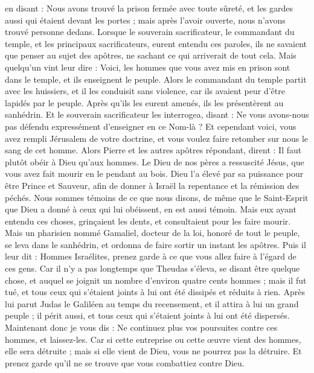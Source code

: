 \begin{multicols}{2}
{en disant : Nous avons trouvé la prison fermée avec toute sûreté, et les gardes aussi qui étaient devant les portes ; mais après l'avoir ouverte, nous n'avons trouvé personne dedans.
Lorsque le souverain sacrificateur, le commandant du temple, et les principaux sacrificateurs, eurent entendu ces paroles, ils ne savaient que penser au sujet des apôtres, ne sachant ce qui arriverait de tout cela.
Mais quelqu'un vint leur dire : Voici, les hommes que vous avez mis en prison sont dans le temple, et ils enseignent le peuple.
Alors le commandant du temple partit avec les huissiers, et il les conduisit sans violence, car ils avaient peur d'être lapidés par le peuple.
Après qu'ils les eurent amenés, ils les présentèrent au sanhédrin. Et le souverain sacrificateur les interrogea,
disant : Ne vous avons-nous pas défendu expressément d'enseigner en ce Nom-là ? Et cependant voici, vous avez rempli Jérusalem de votre doctrine, et vous voulez faire retomber sur nous le sang de cet homme.
Alors Pierre et les autres apôtres répondant, dirent : Il faut plutôt obéir à Dieu qu'aux hommes.
Le Dieu de nos pères a ressuscité Jésus, que vous avez fait mourir en le pendant au bois.
Dieu l'a élevé par sa puissance pour être Prince et Sauveur, afin de donner à Israël la repentance et la rémission des péchés.
Nous sommes témoins de ce que nous disons, de même que le Saint-Esprit que Dieu a donné à ceux qui lui obéissent, en est aussi témoin.
Mais eux ayant entendu ces choses, grinçaient les dents, et consultaient pour les faire mourir.
Mais un pharisien nommé Gamaliel, docteur de la loi, honoré de tout le peuple, se leva dans le sanhédrin, et ordonna de faire sortir un instant les apôtres.
Puis il leur dit : Hommes Israélites, prenez garde à ce que vous allez faire à l'égard de ces gens.
Car il n'y a pas longtemps que Theudas s'éleva, se disant être quelque chose, et auquel se joignit un nombre d'environ quatre cents hommes ; mais il fut tué, et tous ceux qui s'étaient joints à lui ont été dissipés et réduits à rien.
Après lui parut Judas le Galiléen au temps du recensement, et il attira à lui un grand peuple ; il périt aussi, et tous ceux qui s'étaient joints à lui ont été dispersés.
Maintenant donc je vous dis : Ne continuez plus vos poursuites contre ces hommes, et laissez-les. Car si cette entreprise ou cette œuvre vient des hommes, elle sera détruite ;
mais si elle vient de Dieu, vous ne pourrez pas la détruire. Et prenez garde qu'il ne se trouve que vous combattiez contre Dieu.
}
\end{multicols}
